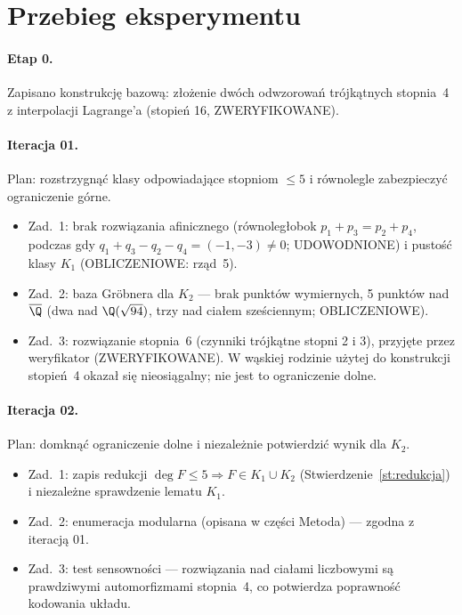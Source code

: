 \section{Przebieg eksperymentu}

\paragraph{Etap 0.} Zapisano konstrukcję bazową: złożenie dwóch odwzorowań trójkątnych
stopnia~4 z interpolacji Lagrange'a (stopień 16, ZWERYFIKOWANE).

\paragraph{Iteracja 01.} Plan: rozstrzygnąć klasy odpowiadające stopniom $\le5$ i równolegle
zabezpieczyć ograniczenie górne.
\begin{itemize}
\item Zad.~1: brak rozwiązania afinicznego (równoległobok $p_1+p_3=p_2+p_4$, podczas gdy
$q_1+q_3-q_2-q_4=(-1,-3)\neq0$; UDOWODNIONE) i pustość klasy $K_1$ (OBLICZENIOWE: rząd~5).
\item Zad.~2: baza Gröbnera dla $K_2$ --- brak punktów wymiernych, 5 punktów nad $\overline\Q$
(dwa nad $\Q(\sqrt{94})$, trzy nad ciałem sześciennym; OBLICZENIOWE).
\item Zad.~3: rozwiązanie stopnia~6 (czynniki trójkątne stopni 2 i 3), przyjęte przez
weryfikator (ZWERYFIKOWANE). W wąskiej rodzinie użytej do konstrukcji stopień~4 okazał się
nieosiągalny; nie jest to ograniczenie dolne.
\end{itemize}

\paragraph{Iteracja 02.} Plan: domknąć ograniczenie dolne i niezależnie potwierdzić wynik
dla $K_2$.
\begin{itemize}
\item Zad.~1: zapis redukcji $\deg F\le5\Rightarrow F\in K_1\cup K_2$
(Stwierdzenie~\ref{st:redukcja}) i niezależne sprawdzenie lematu $K_1$.
\item Zad.~2: enumeracja modularna (opisana w części Metoda) --- zgodna z iteracją 01.
\item Zad.~3: test sensowności --- rozwiązania nad ciałami liczbowymi są prawdziwymi
automorfizmami stopnia~4, co potwierdza poprawność kodowania układu.
\end{itemize}

